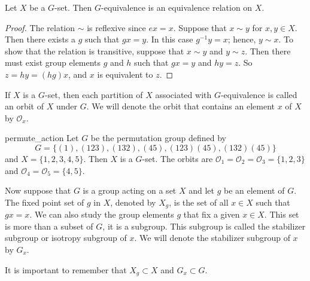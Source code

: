  
\begin{proposition}
Let  $X$ be a $G$-set. Then $G$-equivalence is an equivalence relation
on $X$. 
\end{proposition}
 
 
\begin{proof}
The relation $\sim$ is reflexive since $ex = x$. Suppose that $x \sim
y$ for $x, y \in X$. Then there exists a $g$ such that $gx = y$. In
this case $g^{-1}y=x$; hence, $y \sim x$. To show that the relation is
transitive, suppose that $x \sim y$ and $y \sim z$. Then there must
exist group elements $g$ and $h$ such that $gx = y$ and $hy= z$. So $z
= hy = (hg)x$, and  $x$ is equivalent to $z$.
\end{proof}
 
 
\medskip
 
 
If $X$ is a $G$-set, then each partition of $X$ associated with
$G$-equivalence is called an {\bfi orbit\/} of $X$ under
$G$.  We will denote the orbit that contains an element $x$  of $X$ by
${\mathcal O}_x$\label{noteorbit}. 
 
 
\begin{example}{permute_action}
Let $G$ be the permutation group defined by
\[
G =\{(1), (1 2
3), (1 3 2), (4 5), (1 2 3)(4 5), (1 3 2)(4 5) \}
\]
and $X = \{ 1, 2, 3, 4, 5\}$. Then $X$ is a $G$-set. The orbits are
${\mathcal O}_1 = {\mathcal O}_2 = {\mathcal O}_3 =\{1, 2, 3\}$ and $ {\mathcal O}_4=
{\mathcal O}_5 = \{4, 5\}$. 
\end{example}
 
 

 
 
Now suppose that $G$ is a group acting on a set $X$ and let $g$ be
an element of $G$. The {\bfi fixed point set\/} of $g$ in $X$, denoted by $X_g$\label{notefixed}, is the set of 
all $x \in X$ such
that $gx = x$.  We can also study the group elements $g$ that fix a
given $x \in X$. This set is more than a subset of  $G$, it is a
subgroup.  This subgroup is called the {\bfi stabilizer 
subgroup\/} or {\bfi isotropy 
subgroup\/} of $x$. We will denote the 
stabilizer subgroup of $x$ by $G_x$\label{noteisotropy}. 
 
 
\medskip
 
 
It is important to remember that $X_g \subset X$ and $G_x \subset G$. 
 
